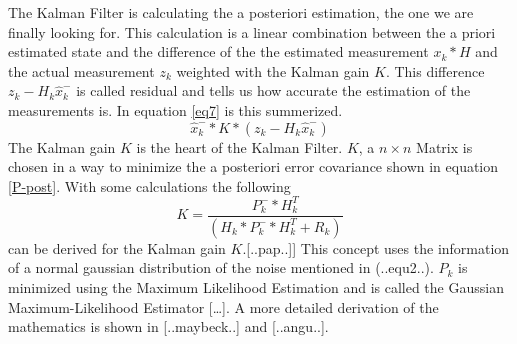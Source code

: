 The Kalman Filter is calculating the a posteriori estimation, the one we are finally looking for. This calculation is a linear combination between the a priori estimated state and the difference of the the estimated measurement $x_k*H$ and the actual measurement $z_k$ weighted with the Kalman gain $K$. This difference $z_k-H_k\hat{x}^{-}_k$ is  called residual and tells us how accurate the estimation of the measurements is. In equation \ref{eq7} is this summerized.
\begin{equation}
\hat{x}_k^{-}*K*(z_k-H_k\hat{x}^{-}_k)\label{eq7}
\end{equation}
The Kalman gain $K$ is the heart of the Kalman Filter. $K$, a $n\times n$ Matrix is chosen in a way to minimize the a posteriori error covariance shown in equation \ref{P-post}. With some calculations the following 
\begin{equation}
K=\frac{P^{-}_k*H^{T}_k}{(H_k*P^{-}_k*H^{T}_k+R_k)}
\end{equation}
can be derived for the Kalman gain $K$.[..pap..]] 
This concept uses the information of a normal gaussian distribution of the noise mentioned in (..equ2..). $P_k$ is minimized using the Maximum Likelihood Estimation and is called the  Gaussian Maximum-Likelihood Estimator […]. A more detailed derivation of the mathematics is shown in [..maybeck..] and [..angu..].

